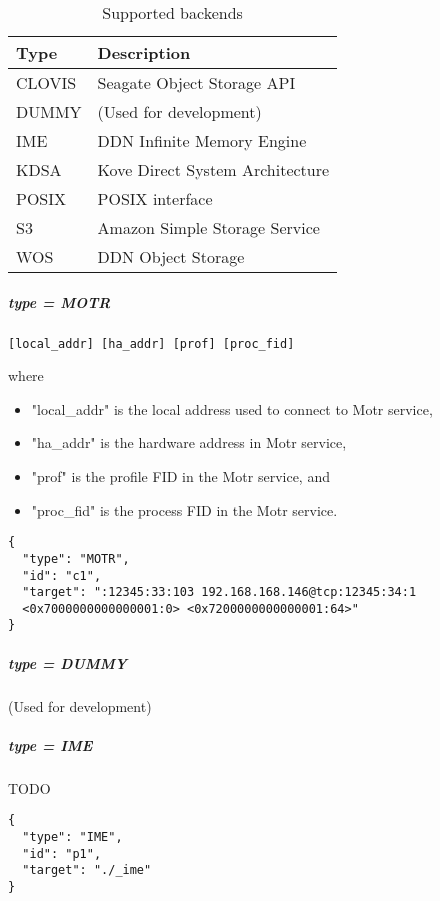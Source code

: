 \begin{table}[!h]
  \begin{center}
    \begin{tabular}{ll}
      Type   & Description                     \\ 
      \hline
      CLOVIS & Seagate Object Storage API      \\ 
      DUMMY  & (Used for development)          \\ 
      IME    & DDN Infinite Memory Engine      \\ 
      KDSA   & Kove Direct System Architecture \\ 
      POSIX  & POSIX interface                 \\ 
      S3     & Amazon Simple Storage Service   \\ 
      WOS    & DDN Object Storage              \\ 
    \end{tabular}
  \end{center}
  \caption{Supported backends}%
  \label{tab:supported_backends}
\end{table}

\subparagraph{type = MOTR}

\begin{lstlisting} 
[local_addr] [ha_addr] [prof] [proc_fid]
\end{lstlisting}

where
\begin{itemize}
  \item "local\_addr" is the local address used to connect to Motr service, 
  \item "ha\_addr" is the hardware address in Motr service, 
  \item "prof" is the profile FID in the Motr service, and
  \item "proc\_fid" is the process FID in the Motr service.
\end{itemize}

\begin{lstlisting} 
{
  "type": "MOTR",
  "id": "c1",
  "target": ":12345:33:103 192.168.168.146@tcp:12345:34:1 
  <0x7000000000000001:0> <0x7200000000000001:64>"
}
\end{lstlisting}

\subparagraph{type = DUMMY}

(Used for development)

\subparagraph{type = IME}
TODO

\begin{lstlisting}
{
  "type": "IME",
  "id": "p1",
  "target": "./_ime"
}
\end{lstlisting}

